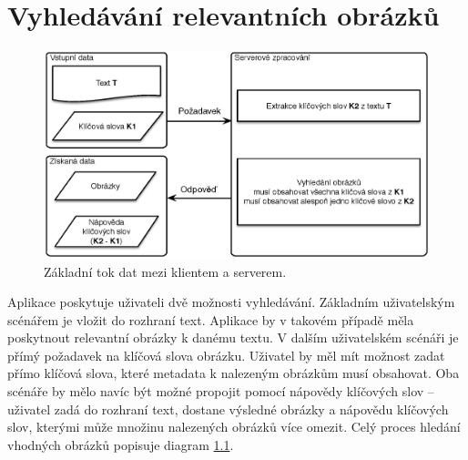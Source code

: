 \chapter{Vyhledávání relevantních obrázků}





\begin{figure}[h]
  \centering
  \includegraphics[width=150mm]{dataflow.eps}
  \caption{Základní tok dat mezi klientem a serverem.}
  \label{fig:dataflow}
\end{figure}


Aplikace poskytuje uživateli dvě možnosti vyhledávání. Základním uživatelským scénářem je vložit do rozhraní text. Aplikace by v takovém případě měla poskytnout relevantní obrázky k danému textu. V dalším uživatelském scénáři je přímý požadavek na klíčová slova obrázku. Uživatel by měl mít možnost zadat přímo klíčová slova, které metadata k nalezeným obrázkům musí obsahovat. Oba scénáře by mělo navíc být možné propojit pomocí nápovědy klíčových slov -- uživatel zadá do rozhraní text, dostane výsledné obrázky a nápovědu klíčových slov, kterými může množinu nalezených obrázků více omezit. Celý proces hledání vhodných obrázků popisuje diagram \ref{fig:dataflow}.

